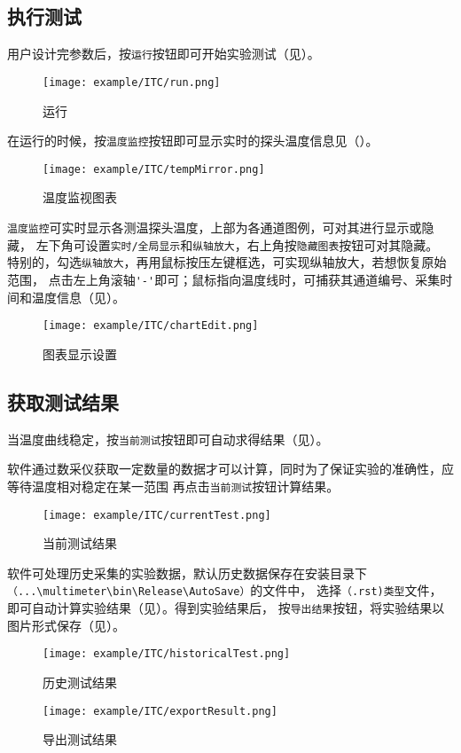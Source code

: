 \subsection{执行测试}
用户设计完参数后，按\lstinline{运行}按钮即可开始实验测试（见）。
\begin{figure}[htbp]
	\centering
	\texttt{[image: example/ITC/run.png]}
	\caption{ 运行 \label{fig:exmp_itc_run}}
\end{figure}
在运行的时候，按\lstinline{温度监控}按钮即可显示实时的探头温度信息见（）。
\begin{figure}[htbp]
	\centering
	\texttt{[image: example/ITC/tempMirror.png]}
	\caption{ 温度监视图表 \label{fig:exmp_itc_tempMirror}}
\end{figure}
\lstinline{温度监控}可实时显示各测温探头温度，上部为各通道图例，可对其进行显示或隐藏，
左下角可设置\lstinline{实时/全局显示}和\lstinline{纵轴放大}，右上角按\lstinline{隐藏图表}按钮可对其隐藏。
特别的，勾选\lstinline{纵轴放大}，再用鼠标按压左键框选，可实现纵轴放大，若想恢复原始范围，
点击左上角滚轴\lstinline{'-'}即可；鼠标指向温度线时，可捕获其通道编号、采集时间和温度信息（见）。\\
\begin{figure}[htbp]
	\centering
	\texttt{[image: example/ITC/chartEdit.png]}
	\caption{ 图表显示设置 \label{fig:exmp_itc_chartEdit}}
\end{figure}

\subsection{获取测试结果}
	当温度曲线稳定，按\lstinline{当前测试}按钮即可自动求得结果（见）。
\begin{note}
	软件通过数采仪获取一定数量的数据才可以计算，同时为了保证实验的准确性，应等待温度相对稳定在某一范围
再点击\lstinline{当前测试}按钮计算结果。
\end{note}
\begin{figure}[htbp]
	\centering
	\texttt{[image: example/ITC/currentTest.png]}
	\caption{ 当前测试结果 \label{fig:exmp_itc_currentTest}}
\end{figure}
软件可处理历史采集的实验数据，默认历史数据保存在安装目录下\lstinline{（...\multimeter\bin\Release\AutoSave）}的文件中，
选择\lstinline{（.rst)类型}文件，即可自动计算实验结果（见）。得到实验结果后，
按\lstinline{导出结果}按钮，将实验结果以图片形式保存（见）。
\begin{figure}[htbp]
	\centering
	\texttt{[image: example/ITC/historicalTest.png]}
	\caption{ 历史测试结果 \label{fig:exmp_itc_historicalTest}}
\end{figure}

\begin{figure}[htbp]
	\centering
	\texttt{[image: example/ITC/exportResult.png]}
	\caption{ 导出测试结果 \label{fig:exmp_itc_exportResult}}
\end{figure}